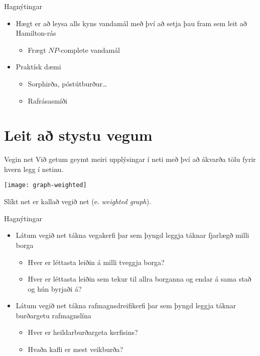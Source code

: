 \documentclass[handout]{beamer}
\begin{document}
\begin{frame}{Hagnýtingar}
\begin{itemize}
 \item Hægt er að leysa alls kyns vandamál með því að setja þau fram sem leit að Hamilton-rás
 \begin{itemize}
  \item Frægt $NP$-complete vandamál
 \end{itemize}
 \item Praktísk dæmi
 \begin{itemize}
  \item Sorphirða, póstútburður\ldots
  \item Rafrásasmíði
 \end{itemize}
\end{itemize}
\end{frame}


\section{Leit að stystu vegum}

\begin{frame}{Vegin net}
Við getum geymt meiri upplýsingar í neti með því að ákvarða tölu fyrir hvern legg í netinu.
\begin{center}
\texttt{[image: graph-weighted]}
\end{center}
Slíkt net er kallað vegið net (e. \emph{weighted graph}).
\end{frame}

\begin{frame}{Hagnýtingar}
\begin{itemize}
 \item Látum vegið net tákna vegakerfi þar sem þyngd leggja táknar fjarlægð milli borga
 \begin{itemize}
  \item Hver er léttasta leiðin á milli tveggja borga?
  \item Hver er léttasta leiðin sem tekur til allra borganna og endar á sama stað og hún byrjaði á?
 \end{itemize}
 \item Látum vegið net tákna rafmagnsdreifikerfi þar sem þyngd leggja táknar burðargetu rafmagnslína
 \begin{itemize}
  \item Hver er heildarburðargeta kerfisins?
  \item Hvaða kafli er mest veikburða?
 \end{itemize}
\end{itemize}
\end{frame}
\end{document}
